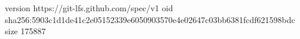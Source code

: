 version https://git-lfs.github.com/spec/v1
oid sha256:5903c1d1de41c2e05152339e6050903570e4e02647c03bb6381fcdf621598bdc
size 175887
